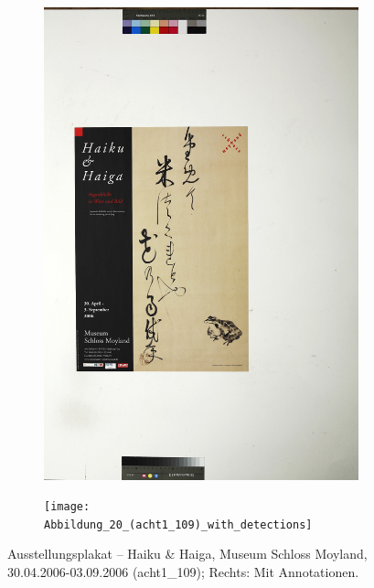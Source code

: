 \documentclass[a4paper,12pt,ngerman]{article}
\begin{document}
\newpage
\begin{landscape}
\begin{figure}[ht]
	\begin{subfigure}[b]{0.5\linewidth}
	\centering
	\includegraphics[height=\linewidth]{Abbildung_24_(acht1_109)}
	\end{subfigure}
	\begin{subfigure}[b]{0.5\linewidth}
	\centering
	\texttt{[image: Abbildung\_20\_(acht1\_109)\_with\_detections]}
	\end{subfigure}
	\caption{Ausstellungsplakat – Haiku \& Haiga, Museum Schloss Moyland, 30.04.2006-03.09.2006 (acht1\_109); Rechts: Mit Annotationen.}
\end{figure}
\end{landscape}
\end{document}
